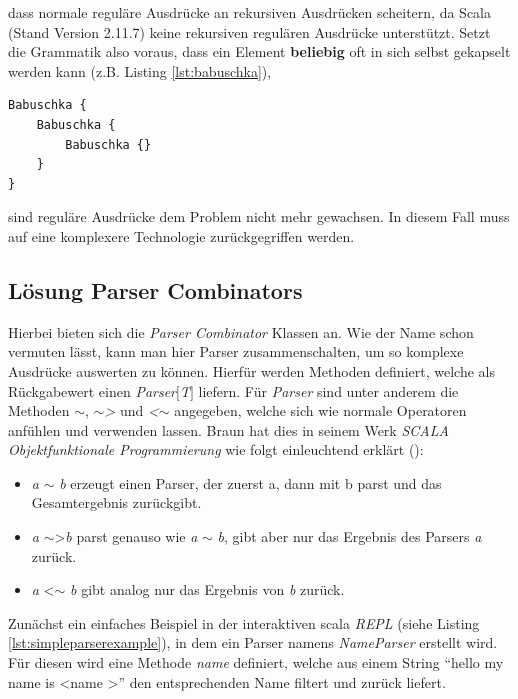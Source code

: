 dass normale reguläre Ausdrücke an rekursiven Ausdrücken scheitern, da Scala (Stand Version 2.11.7) keine rekursiven regulären Ausdrücke unterstützt. Setzt die Grammatik also voraus, dass ein Element \textbf{beliebig} oft in sich selbst gekapselt werden kann (z.B. Listing \ref{lst:babuschka}),
\begin{lstlisting}[style=scala, caption = {Beispiel für eine rekursive Grammatik anhand der russischen \textit{Babuschka} Puppen}, label = {lst:babuschka}]
Babuschka {
    Babuschka {
        Babuschka {}
    }
}
\end{lstlisting}sind reguläre Ausdrücke dem Problem nicht mehr gewachsen.
In diesem Fall muss auf eine komplexere Technologie zurückgegriffen werden.
\subsection{Lösung Parser Combinators}Hierbei bieten sich die \textit{Parser Combinator} Klassen an. Wie der Name schon vermuten lässt, kann man hier Parser zusammenschalten, um so komplexe Ausdrücke auswerten zu können. Hierfür werden Methoden definiert, welche als Rückgabewert einen \textit{Parser$[$T$]$} liefern. Für \textit{Parser} sind unter anderem die Methoden \textit{$\sim$}, \textit{$\sim$\textgreater} und \textit{\textless$\sim$} angegeben, welche sich wie normale Operatoren anfühlen und verwenden lassen. Braun hat dies in seinem Werk \textit{SCALA Objektfunktionale Programmierung} wie folgt einleuchtend erklärt ():
\begin{itemize}
\item \textit{a} $\sim$ \textit{b} erzeugt einen Parser, der zuerst a, dann mit b parst und das Gesamtergebnis zurückgibt.  
\item \textit{a} $\sim$\textgreater \textit{b} parst genauso wie \textit{a} $\sim$ \textit{b}, gibt aber nur das Ergebnis des Parsers \textit{a} zurück.
\item \textit{a} \textless$\sim$ \textit{b} gibt analog nur das Ergebnis von \textit{b} zurück. 
\end{itemize}Zunächst ein einfaches Beispiel in der interaktiven scala \textit{REPL} (siehe Listing \ref{lst:simpleparserexample}), in dem ein Parser namens \textit{NameParser} erstellt wird. Für diesen wird eine Methode \textit{name} definiert, welche aus einem String "`hello my name is \textless name \textgreater"' den entsprechenden Name filtert und zurück liefert.
